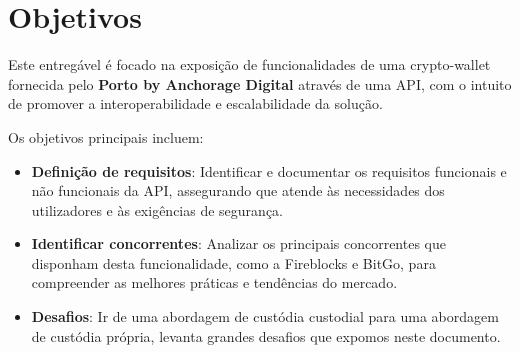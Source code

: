 \newpage
\section{Objetivos}
Este entregável é focado na exposição de funcionalidades de uma crypto-wallet fornecida pelo \textbf{Porto by Anchorage Digital} através de uma API, com o intuito de promover a interoperabilidade e escalabilidade da solução.

Os objetivos principais incluem:
\begin{itemize}
    \item \textbf{Definição de requisitos}: Identificar e documentar os requisitos funcionais e não funcionais da API, assegurando que atende às necessidades dos utilizadores e às exigências de segurança.
    \item \textbf{Identificar concorrentes}: Analizar os principais concorrentes que disponham desta funcionalidade, como a Fireblocks e BitGo, para compreender as melhores práticas e tendências do mercado.
    \item \textbf{Desafios}: Ir de uma abordagem de custódia custodial para uma abordagem de custódia própria, levanta grandes desafios que expomos neste documento.
\end{itemize}